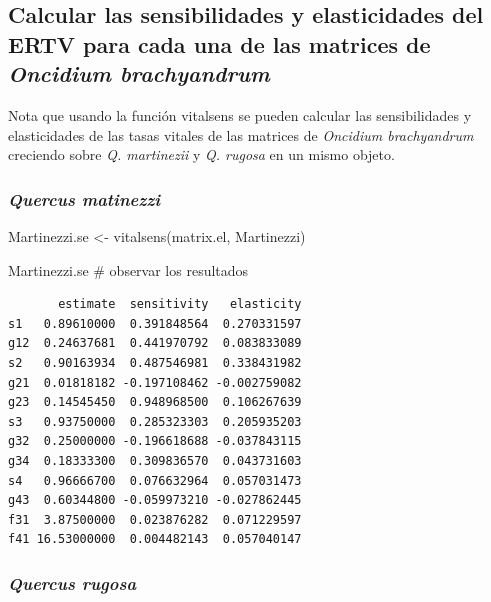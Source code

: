 \documentclass[
  12pt,
  letterpaper,
]{book}
\newenvironment{Shaded}{\begin{snugshade}}{\end{snugshade}}
\newcommand{\CommentTok}[1]{\textcolor[rgb]{0.37,0.37,0.37}{#1}}
\newcommand{\FunctionTok}[1]{\textcolor[rgb]{0.28,0.35,0.67}{#1}}
\newcommand{\NormalTok}[1]{\textcolor[rgb]{0.00,0.23,0.31}{#1}}
\newcommand{\OtherTok}[1]{\textcolor[rgb]{0.00,0.23,0.31}{#1}}
\begin{document}
\subsection{\texorpdfstring{Calcular las sensibilidades y elasticidades
del ERTV para cada una de las matrices de \emph{Oncidium
brachyandrum}}{Calcular las sensibilidades y elasticidades del ERTV para cada una de las matrices de Oncidium brachyandrum}}\label{calcular-las-sensibilidades-y-elasticidades-del-ertv-para-cada-una-de-las-matrices-de-oncidium-brachyandrum}

Nota que usando la función vitalsens se pueden calcular las
sensibilidades y elasticidades de las tasas vitales de las matrices de
\emph{Oncidium brachyandrum} creciendo sobre \emph{Q. martinezii} y
\emph{Q. rugosa} en un mismo objeto.

\subsubsection{\texorpdfstring{\emph{Quercus
matinezzi}}{Quercus matinezzi}}\label{quercus-matinezzi}

\begin{Shaded}
\begin{Highlighting}[]
\NormalTok{Martinezzi.se }\OtherTok{\textless{}{-}} \FunctionTok{vitalsens}\NormalTok{(matrix.el, Martinezzi)}

\NormalTok{Martinezzi.se }\CommentTok{\# observar los resultados}
\end{Highlighting}
\end{Shaded}

\begin{verbatim}
       estimate  sensitivity   elasticity
s1   0.89610000  0.391848564  0.270331597
g12  0.24637681  0.441970792  0.083833089
s2   0.90163934  0.487546981  0.338431982
g21  0.01818182 -0.197108462 -0.002759082
g23  0.14545450  0.948968500  0.106267639
s3   0.93750000  0.285323303  0.205935203
g32  0.25000000 -0.196618688 -0.037843115
g34  0.18333300  0.309836570  0.043731603
s4   0.96666700  0.076632964  0.057031473
g43  0.60344800 -0.059973210 -0.027862445
f31  3.87500000  0.023876282  0.071229597
f41 16.53000000  0.004482143  0.057040147
\end{verbatim}

\subsubsection{\texorpdfstring{\emph{Quercus
rugosa}}{Quercus rugosa}}\label{quercus-rugosa}
\end{document}
